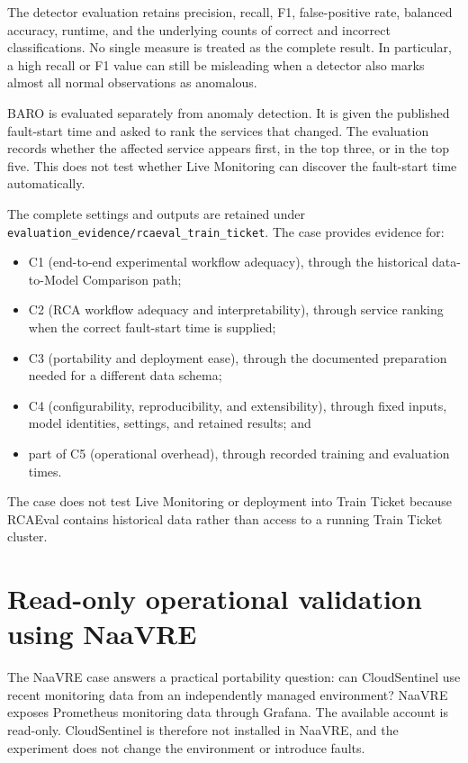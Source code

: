 The detector evaluation retains precision, recall, F1, false-positive rate, balanced accuracy, runtime, and the underlying counts of correct and incorrect classifications. No single measure is treated as the complete result. In particular, a high recall or F1 value can still be misleading when a detector also marks almost all normal observations as anomalous.

BARO is evaluated separately from anomaly detection. It is given the published fault-start time and asked to rank the services that changed. The evaluation records whether the affected service appears first, in the top three, or in the top five. This does not test whether Live Monitoring can discover the fault-start time automatically.

The complete settings and outputs are retained under \texttt{evaluation\_evidence/rcaeval\_train\_ticket}. The case provides evidence for:
\begin{itemize}
    \item C1 (end-to-end experimental workflow adequacy), through the historical data-to-Model Comparison path;
    \item C2 (RCA workflow adequacy and interpretability), through service ranking when the correct fault-start time is supplied;
    \item C3 (portability and deployment ease), through the documented preparation needed for a different data schema;
    \item C4 (configurability, reproducibility, and extensibility), through fixed inputs, model identities, settings, and retained results; and
    \item part of C5 (operational overhead), through recorded training and evaluation times.
\end{itemize}
The case does not test Live Monitoring or deployment into Train Ticket because RCAEval contains historical data rather than access to a running Train Ticket cluster.

\section{Read-only operational validation using NaaVRE}
\label{sec:naavre_protocol}

The NaaVRE case answers a practical portability question: can CloudSentinel use recent monitoring data from an independently managed environment? NaaVRE exposes Prometheus monitoring data through Grafana. The available account is read-only. CloudSentinel is therefore not installed in NaaVRE, and the experiment does not change the environment or introduce faults.

